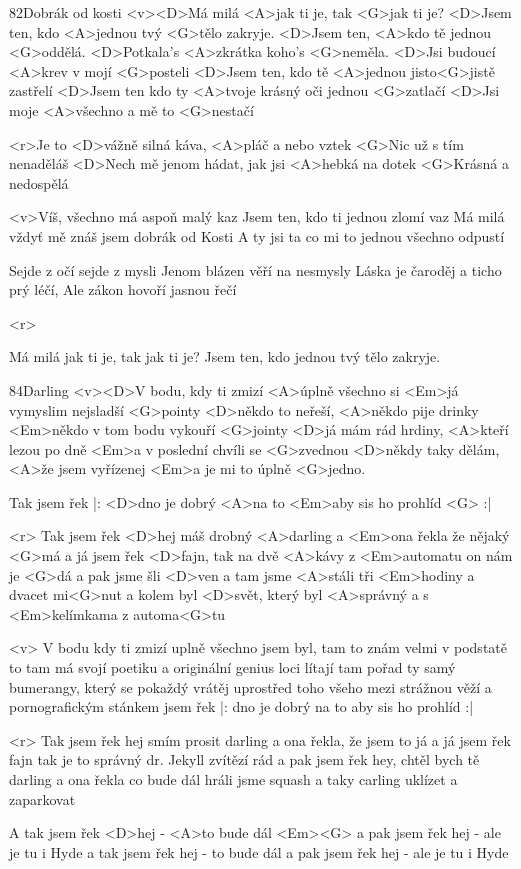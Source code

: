 \begin{song}[Chinaski]{82}{Dobrák od kosti}{}
	<v><D>Má milá <A>jak ti je, tak <G>jak ti je?
	<D>Jsem ten, kdo <A>jednou tvý <G>tělo zakryje.
	<D>Jsem ten, <A>kdo tě jednou <G>oddělá.
	<D>Potkala's <A>zkrátka koho's <G>neměla.
	<D>Jsi budoucí <A>krev v mojí <G>posteli
	<D>Jsem ten, kdo tě <A>jednou jisto<G>jistě zastřelí
	<D>Jsem ten kdo ty <A>tvoje krásný oči jednou <G>zatlačí
	<D>Jsi moje <A>všechno a mě to <G>nestačí

	<r>Je to <D>vážně silná káva, <A>pláč a nebo vztek
	<G>Nic už s tím nenaděláš
	<D>Nech mě jenom hádat, jak jsi <A>hebká na dotek
	<G>Krásná a nedospělá

	<v>Víš, všechno má aspoň malý kaz
	Jsem ten, kdo ti jednou zlomí vaz
	Má milá vždyť mě znáš jsem dobrák od Kosti
	A ty jsi ta co mi to jednou všechno odpustí

	Sejde z očí sejde z mysli
	Jenom blázen věří na nesmysly
	Láska je čaroděj a ticho prý léčí,
	Ale zákon hovoří jasnou řečí

	<r>

	Má milá jak ti je, tak jak ti je?
	Jsem ten, kdo jednou tvý tělo zakryje.
\end{song}
\begin{song}{84}{Darling}{}
	<v><D>V bodu, kdy ti zmizí <A>úplně všechno
	si <Em>já vymyslim nejsladší <G>pointy
	<D>někdo to neřeší, <A>někdo pije drinky
	<Em>někdo v tom bodu vykouří <G>jointy
	<D>já mám rád hrdiny, <A>kteří lezou po dně
	<Em>a v poslední chvíli se <G>zvednou
	<D>někdy taky dělám, <A>že jsem vyřízenej
	<Em>a je mi to úplně <G>jedno.

	Tak jsem řek
	|: <D>dno je dobrý <A>na to <Em>aby sis ho prohlíd <G> :|

	<r> Tak jsem řek <D>hej máš drobný <A>darling
	a <Em>ona řekla že nějaký <G>má
	a já jsem řek <D>fajn, tak na dvě <A>kávy
	z <Em>automatu on nám je <G>dá
	a pak jsme šli <D>ven a tam jsme <A>stáli
	tři <Em>hodiny a dvacet mi<G>nut
	a kolem byl <D>svět, který byl <A>správný
	a s <Em>kelímkama z automa<G>tu

	<v> V bodu kdy ti zmizí uplně všechno
	jsem byl, tam to znám velmi
	v podstatě to tam má svojí poetiku
	a originální genius loci
	lítají tam pořad ty samý bumerangy, který se pokaždý vrátěj
	uprostřed toho všeho mezi strážnou věží
	a pornografickým stánkem
	jsem řek
	|: dno je dobrý na to aby sis ho prohlíd :|

	<r> Tak jsem řek hej smím prosit darling
	a ona řekla, že jsem to já
	a já jsem řek fajn tak je to správný
	dr. Jekyll zvítězí rád
	a pak jsem řek hey, chtěl bych tě darling
	a ona řekla co bude dál
	hráli jsme squash a taky carling
	uklízet a zaparkovat

	A tak jsem řek <D>hej - <A>to bude dál <Em><G>
	a pak jsem řek hej - ale je tu i Hyde
	a tak jsem řek hej - to bude dál
	a pak jsem řek hej - ale je tu i Hyde
\end{song}
